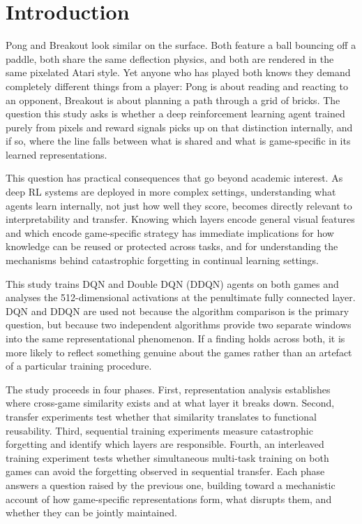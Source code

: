 \documentclass[a4paper]{article}
\begin{document}
\tableofcontents
\newpage

\section{Introduction}

Pong and Breakout look similar on the surface. Both feature a ball bouncing off a paddle,
both share the same deflection physics, and both are rendered in the same pixelated Atari
style. Yet anyone who has played both knows they demand completely different things from a
player: Pong is about reading and reacting to an opponent, Breakout is about planning a
path through a grid of bricks. The question this study asks is whether a deep reinforcement
learning agent trained purely from pixels and reward signals picks up on that distinction
internally, and if so, where the line falls between what is shared and what is game-specific
in its learned representations.

This question has practical consequences that go beyond academic interest. As deep RL
systems are deployed in more complex settings, understanding what agents learn internally,
not just how well they score, becomes directly relevant to interpretability and transfer.
Knowing which layers encode general visual features and which encode game-specific strategy
has immediate implications for how knowledge can be reused or protected across tasks, and
for understanding the mechanisms behind catastrophic forgetting in continual learning
settings.

This study trains DQN \cite{mnih2015human} and Double DQN (DDQN) \cite{van2016deep}
agents on both games and analyses the 512-dimensional activations at the penultimate
fully connected layer. DQN and DDQN are used not because the algorithm comparison is the
primary question, but because two independent algorithms provide two separate windows into
the same representational phenomenon. If a finding holds across both, it is more likely to
reflect something genuine about the games rather than an artefact of a particular training
procedure.

The study proceeds in four phases. First, representation analysis establishes where
cross-game similarity exists and at what layer it breaks down. Second, transfer experiments
test whether that similarity translates to functional reusability. Third, sequential
training experiments measure catastrophic forgetting and identify which layers are
responsible. Fourth, an interleaved training experiment tests whether simultaneous
multi-task training on both games can avoid the forgetting observed in sequential transfer.
Each phase answers a question raised by the previous one, building toward a mechanistic
account of how game-specific representations form, what disrupts them, and whether they
can be jointly maintained.
\end{document}
